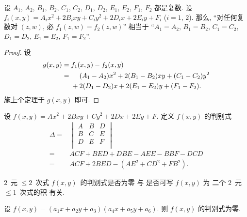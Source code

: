 \begin{theorem}
    设 \(A_1\), \(A_2\),
    \(B_1\), \(B_2\),
    \(C_1\), \(C_2\),
    \(D_1\), \(D_2\),
    \(E_1\), \(E_2\),
    \(F_1\), \(F_2\)
    都是复数.
    设
    \(f_i (x, y) = A_i x^2 + 2B_i xy + C_i y^2
    + 2D_i x + 2E_i y + F_i\)
    (\(i = 1\), \(2\)).
    那么,
    ``对任何复数对 \((z, w)\), 必 \(f_1 (z, w) = f_2 (z, w)\)''
    相当于
    ``\(A_1 = A_2\), \(B_1 = B_2\), \(C_1 = C_2\),
    \(D_1 = D_2\), \(E_1 = E_2\), \(F_1 = F_2\)''.
\end{theorem}

\begin{proof}
    设
    \begin{align*}
        g(x, y)
        = {} & f_1 (x, y) - f_2 (x, y)
        \\
        = {} & \hphantom{{} + {}}
        (A_1 - A_2) x^2 + 2(B_1 - B_2) xy + (C_1 - C_2) y^2
        \\
             &
        + 2(D_1 - D_2) x + 2(E_1 - E_2) y + (F_1 - F_2).
    \end{align*}
    施上个定理于 \(g(x, y)\) 即可.
\end{proof}

\begin{definition}
    设 \(f(x, y) = Ax^2 + 2Bxy + Cy^2 + 2Dx + 2Ey + F\).
    定义 \(f(x, y)\) 的判别式
    \begin{align*}
        \Delta
        = {} &
        \begin{vmatrix}
            A & B & D \\
            B & C & E \\
            D & E & F \\
        \end{vmatrix}                            \\
        = {} & ACF + BED + DBE - AEE - BBF - DCD  \\
        = {} & ACF + 2BED - (AE^2 + CD^2 + FB^2).
    \end{align*}
\end{definition}

\(2\)~元 \({\leq} 2\)~次式 \(f(x, y)\)~的判别式是否为零%
与%
是否可写 \(f(x, y)\) 为%
二个 \(2\)~元 \({\leq} 1\)~次式的积%
有关.

\begin{theorem}
    设 \(f(x, y) = (a_1 x + a_2 y + a_3) (a_4 x + a_5 y + a_6)\).
    则 \(f(x, y)\) 的判别式为零.
\end{theorem}

